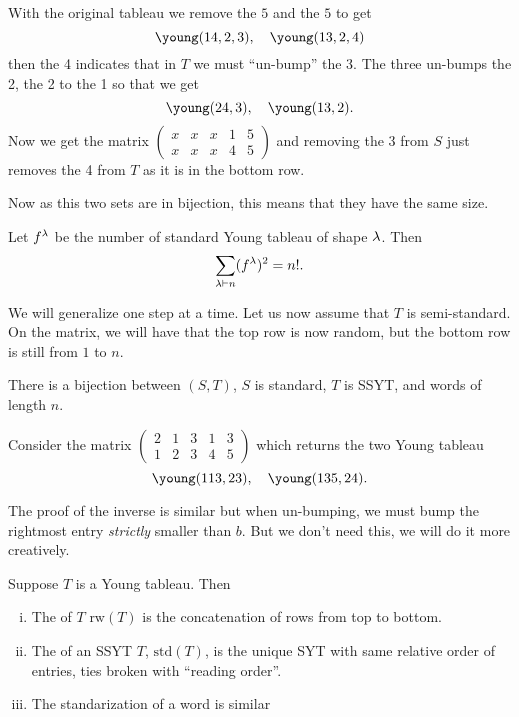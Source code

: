 \documentclass[12pt]{memoir}
\begin{document}
With the original tableau we remove the $5$ and the $5$ to get 
$$\young(14,2,3),\quad \young(13,2,4)$$
then the 4 indicates that in $T$ we must ``un-bump'' the 3. The three un-bumps the 2, the 2 to the 1 so that we get 
$$\young(24,3),\quad \young(13,2).$$
Now we get the matrix $\begin{pmatrix}
    x&x&x&1&5\\x&x&x&4&5
\end{pmatrix}$ and removing the 3 from $S$ just removes the 4 from $T$ as it is in the bottom row.\par 
Now as this two sets are in bijection, this means that they have the same size.

\begin{Cor}
    Let $f^\lambda$ be the number of standard Young tableau of shape $\lambda$. Then 
    $$\sum_{\lambda\vdash n}(f^\lambda)^2=n!.$$
\end{Cor}

We will generalize one step at a time. Let us now assume that $T$ is semi-standard. On the matrix, we will have that the top row is now random, but the bottom row is still from $1$ to $n$. 

\begin{Lem}[Schensted]
    There is a bijection between $(S,T)$, $S$ is standard, $T$ is SSYT, and words of length $n$.
\end{Lem}

\begin{Ex}
    Consider the matrix $\begin{pmatrix}
        2&1&3&1&3\\1&2&3&4&5
    \end{pmatrix}$ which returns the two Young tableau 
    $$\young(113,23),\quad \young(135,24).$$
\end{Ex}

The proof of the inverse is similar but when un-bumping, we must bump the rightmost entry \emph{strictly} smaller than $b$. But we don't need this, we will do it more creatively.

\begin{Def}
    Suppose $T$ is a Young tableau. Then 
    \begin{enumerate}[i)]
        \itemsep=-0.4em
        \item The  of $T$ $\text{rw}(T)$ is the concatenation of rows from top to bottom.
        \item The  of an SSYT $T$, $\text{std}(T)$, is the unique    SYT with same relative order of entries, ties broken with ``reading order''.
        \item The standarization of a word is similar
       \end{enumerate}
\end{Def}
\end{document}

